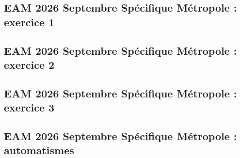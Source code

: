 \documentclass[lang=fr,edition=teacher,layout=sheet]{mxbook}
\begin{document}
\par\bigskip
{}\subsection*{EAM 2026 Septembre Spécifique Métropole : exercice 1}
\begingroup\endgroup
\par\bigskip
{}\subsection*{EAM 2026 Septembre Spécifique Métropole : exercice 2}
\begingroup\endgroup
\par\bigskip
{}\subsection*{EAM 2026 Septembre Spécifique Métropole : exercice 3}
\begingroup\endgroup
\par\bigskip
{}\subsection*{EAM 2026 Septembre Spécifique Métropole : automatismes}
\begingroup\endgroup
\par\bigskip
\end{document}
